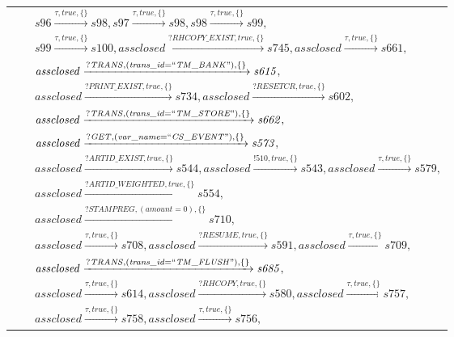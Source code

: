\begin{tabular}{lcp{350px}}
& & $\mathit{s96}\xrightarrow{\mathit{\tau}, \mathit{true}, \{\}}\mathit{s98},\mathit{s97}\xrightarrow{\mathit{\tau}, \mathit{true}, \{\}}\mathit{s98},\mathit{s98}\xrightarrow{\mathit{\tau}, \mathit{true}, \{\}}\mathit{s99},$ \\
& & $\mathit{s99}\xrightarrow{\mathit{\tau}, \mathit{true}, \{\}}\mathit{s100},\mathit{assclosed}\xrightarrow{\mathit{?RHCOPY\_EXIST}, \mathit{true}, \{\}}\mathit{s745},\mathit{assclosed}\xrightarrow{\mathit{\tau}, \mathit{true}, \{\}}\mathit{s661},$ \\
& & $\mathit{assclosed}\xrightarrow{\mathit{?TRANS}, \mathit{(trans\_id = ``TM\_BANK")}, \{\}}\mathit{s615},$ \\
& & $\mathit{assclosed}\xrightarrow{\mathit{?PRINT\_EXIST}, \mathit{true}, \{\}}\mathit{s734},\mathit{assclosed}\xrightarrow{\mathit{?RESETCR}, \mathit{true}, \{\}}\mathit{s602},$ \\
& & $\mathit{assclosed}\xrightarrow{\mathit{?TRANS}, \mathit{(trans\_id = ``TM\_STORE")}, \{\}}\mathit{s662},$ \\
& & $\mathit{assclosed}\xrightarrow{\mathit{?GET}, \mathit{(var\_name = ``CS\_EVENT")}, \{\}}\mathit{s573},$ \\
& & $\mathit{assclosed}\xrightarrow{\mathit{?ARTID\_EXIST}, \mathit{true}, \{\}}\mathit{s544},\mathit{assclosed}\xrightarrow{\mathit{!510}, \mathit{true}, \{\}}\mathit{s543},\mathit{assclosed}\xrightarrow{\mathit{\tau}, \mathit{true}, \{\}}\mathit{s579},$ \\
& & $\mathit{assclosed}\xrightarrow{\mathit{?ARTID\_WEIGHTED}, \mathit{true}, \{\}}\mathit{s554},$ \\
& & $\mathit{assclosed}\xrightarrow{\mathit{?STAMPREG}, \mathit{(amount = 0)}, \{\}}\mathit{s710},$ \\
& & $\mathit{assclosed}\xrightarrow{\mathit{\tau}, \mathit{true}, \{\}}\mathit{s708},\mathit{assclosed}\xrightarrow{\mathit{?RESUME}, \mathit{true}, \{\}}\mathit{s591},\mathit{assclosed}\xrightarrow{\mathit{\tau}, \mathit{true}, \{\}}\mathit{s709},$ \\
& & $\mathit{assclosed}\xrightarrow{\mathit{?TRANS}, \mathit{(trans\_id = ``TM\_FLUSH")}, \{\}}\mathit{s685},$ \\
& & $\mathit{assclosed}\xrightarrow{\mathit{\tau}, \mathit{true}, \{\}}\mathit{s614},\mathit{assclosed}\xrightarrow{\mathit{?RHCOPY}, \mathit{true}, \{\}}\mathit{s580},\mathit{assclosed}\xrightarrow{\mathit{\tau}, \mathit{true}, \{\}}\mathit{s757},$ \\
& & $\mathit{assclosed}\xrightarrow{\mathit{\tau}, \mathit{true}, \{\}}\mathit{s758},\mathit{assclosed}\xrightarrow{\mathit{\tau}, \mathit{true}, \{\}}\mathit{s756},$ \\

\end{tabular}
